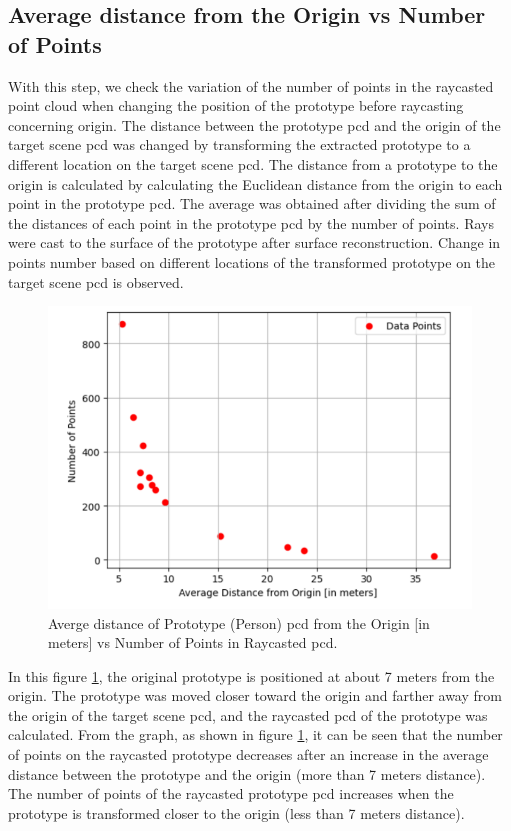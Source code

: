 \subsection{Average distance from the Origin vs Number of Points}
With this step, we check the variation of the number of points in the raycasted point cloud when changing the position of the prototype before raycasting concerning origin. The distance between the prototype \acrshort{pcd} and the origin of the target scene \acrshort{pcd} was changed by transforming the extracted prototype to a different location on the target scene \acrshort{pcd}. The distance from a prototype to the origin is calculated by calculating the Euclidean distance from the origin to each point in the prototype \acrshort{pcd}. The average was obtained after dividing the sum of the distances of each point in the prototype \acrshort{pcd} by the number of points. Rays were cast to the surface of the prototype after surface reconstruction.  Change in points number based on different locations of the transformed prototype on the target scene \acrshort{pcd} is observed.

\begin{figure}[htbp]
    \centering
    \includegraphics[width=0.8\linewidth]{97_graphics/evaluation/avg_distn_vs_points_numbers.pdf}
    \caption{Averge distance of Prototype (Person) \acrshort{pcd} from the Origin [in meters] vs Number of Points in Raycasted \acrshort{pcd}.}
    \label{fig:evalution_avg_distn_vs_points_number}
\end{figure}
In this figure \ref{fig:evalution_avg_distn_vs_points_number}, the original prototype is positioned at about 7 meters from the origin. The prototype was moved closer toward the origin and farther away from the origin of the target scene \acrshort{pcd}, and the raycasted \acrshort{pcd} of the prototype was calculated. From the graph, as shown in figure \ref{fig:evalution_avg_distn_vs_points_number}, it can be seen that the number of points on the raycasted prototype decreases after an increase in the average distance between the prototype and the origin (more than 7 meters distance). The number of points of the raycasted prototype \acrshort{pcd} increases when the prototype is transformed closer to the origin (less than 7 meters distance).

